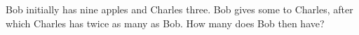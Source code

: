 Bob initially has nine apples and Charles three. Bob gives some to Charles, after which Charles has twice as many as Bob. How many does Bob then have?
